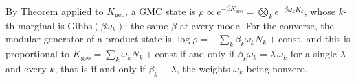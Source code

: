 By Theorem  applied to $K_{\mathrm{geo}}$, a GMC state is $\rho \propto e^{-\beta K_{\mathrm{geo}}} = \bigotimes_k e^{-\beta\omega_k K_k}$, whose $k$-th marginal is $\mathrm{Gibbs}(\beta\omega_k)$: the same $\beta$ at every mode. For the converse, the modular generator of a product state is $\log\rho = -\sum_k \beta_k\omega_k N_k + \mathrm{const}$, and this is proportional to $K_{\mathrm{geo}} = \sum_k \omega_k N_k + \mathrm{const}$ if and only if $\beta_k \omega_k = \lambda\,\omega_k$ for a single $\lambda$ and every $k$, that is if and only if $\beta_k \equiv \lambda$, the weights $\omega_k$ being nonzero.
